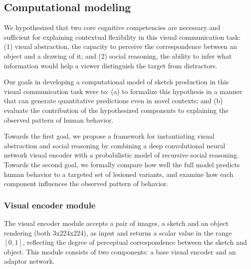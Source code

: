 \documentclass[9pt,twocolumn,twoside]{pnas-new}
\begin{document}
{%

\subsection*{Computational modeling}

We hypothesized that two core cognitive competencies are necessary and sufficient for explaining contextual flexibility in this visual communication task: (1) visual abstraction, the capacity to perceive the correspondence between an object and a drawing of it; and (2) social reasoning, the ability to infer what information would help a viewer distinguish the target from distractors.

Our goals in developing a computational model of sketch production in this visual communication task were to: (a) to formalize this hypothesis in a manner that can generate quantitative predictions even in novel contexts; and (b) evaluate the contribution of the hypothesized components to explaining the observed pattern of human behavior.  

Towards the first goal, we propose a framework for instantiating visual abstraction and social reasoning by combining a deep convolutional neural network visual encoder with a probabilistic model of recursive social reasoning. Towards the second goal, we formally compare how well the full model predicts human behavior to a targeted set of lesioned variants, and examine how each component influences the observed pattern of behavior.  

\subsubsection*{Visual encoder module}

The visual encoder module accepts a pair of images, a sketch and an object rendering (both 3x224x224), as input and returns a scalar value in the range $[0,1]$, reflecting the degree of perceptual correspondence between the sketch and object. This module consists of two components: a base visual encoder and an adaptor network. 

}
\end{document}
